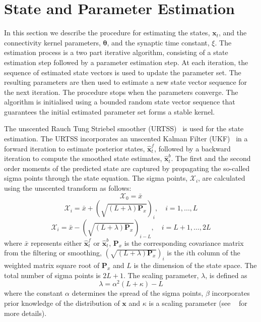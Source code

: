 \documentclass[twocolumn,11pt,a4paper]{article}		%
\begin{document}
% 
\section{State and Parameter Estimation}\label{StateAndParameterEstimationSection} In this section we describe the procedure for estimating the states, $\mathbf{x}_t$, and the connectivity kernel parameters, $\boldsymbol \theta$, and the synaptic time constant, $\xi$. The estimation process is a two part iterative algorithm, consisting of a state estimation step followed by a parameter estimation step. At each iteration, the sequence of estimated state vectors is used to update the parameter set. The resulting parameters are then used to estimate a new state vector sequence for the next iteration. The procedure stops when the parameters converge. The algorithm is initialised using a bounded random state vector sequence that guarantees the initial estimated parameter set forms a stable kernel.

The unscented Rauch Tung Striebel smoother (URTSS)~\cite{Sarkka2010} is used for the state estimation. The URTSS incorporates an unscented Kalman Filter (UKF)~\cite{Julier1997, Merwe2003} in a forward iteration to estimate posterior states, $\hat{\mathbf x}_t^{f}$, followed by a backward iteration to compute the smoothed state estimates, $\hat{\mathbf x}_t^{b}$. The first and the second order moments of the predicted state are captured by propagating the so-called sigma points through the state equation. The sigma points, $\mathcal X_i$, are calculated using the unscented transform as follows:
\begin{equation}\label{eq:sigmapoints1}
	\mathcal X_{0}=\bar x 
\end{equation}
\begin{equation}
	\mathcal X_{i}=\bar x+(\sqrt{( L + \lambda)\mathbf P_x})_i, \quad i=1, \dots, L 
\end{equation}
\begin{equation}\label{eq:sigmapoints2}
	\mathcal X_{i}=\bar x-(\sqrt{( L + \lambda)\mathbf P_x})_{i- L}, \quad i= L+1, \dots, 2 L 
\end{equation}
where $\bar x$ represents either $\hat{\mathbf x}_t^{f}$ or $\hat{\mathbf x}_t^{b}$, $\mathbf{P}_x$ is the corresponding covariance matrix from the filtering or smoothing, $(\sqrt{( L + \lambda)\mathbf P_x})_i$ is the $i$th column of the weighted matrix square root of $\mathbf P_x$ and $L$ is the dimension of the state space. The total number of sigma points is $2L+1$. The scaling parameter, $\lambda$, is defined as 
\begin{equation}\label{eq:sigmapoints3}
	\lambda=\alpha^2( L+\kappa) - L 
\end{equation}
where the constant $\alpha$ determines the spread of the sigma points, $\beta$ incorporates prior knowledge of the distribution of $\mathbf{x}$ and $\kappa$ is a scaling parameter (see ~\cite{Haykin2001} for more details). 
\end{document}

